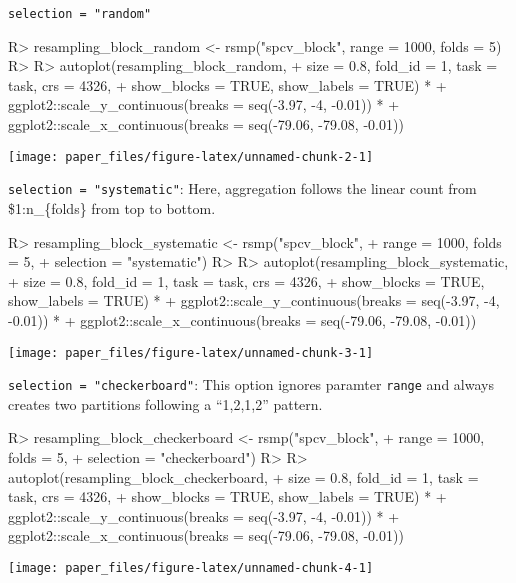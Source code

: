 \documentclass[
]{jss}
\begin{document}
\texttt{selection\ =\ "random"}

\begin{CodeChunk}
\begin{CodeInput}
R> resampling_block_random <- rsmp("spcv_block", range = 1000, folds = 5)
R> 
R> autoplot(resampling_block_random,
+   size = 0.8, fold_id = 1, task = task, crs = 4326,
+   show_blocks = TRUE, show_labels = TRUE) *
+   ggplot2::scale_y_continuous(breaks = seq(-3.97, -4, -0.01)) *
+   ggplot2::scale_x_continuous(breaks = seq(-79.06, -79.08, -0.01))
\end{CodeInput}


\begin{center}\texttt{[image: paper\_files/figure-latex/unnamed-chunk-2-1]} \end{center}

\end{CodeChunk}

\texttt{selection\ =\ "systematic"}: Here, aggregation follows the
linear count from \$1:n\_\{folds\} from top to bottom.

\begin{CodeChunk}
\begin{CodeInput}
R> resampling_block_systematic <- rsmp("spcv_block",
+   range = 1000, folds = 5,
+   selection = "systematic")
R> 
R> autoplot(resampling_block_systematic,
+   size = 0.8, fold_id = 1, task = task, crs = 4326,
+   show_blocks = TRUE, show_labels = TRUE) *
+   ggplot2::scale_y_continuous(breaks = seq(-3.97, -4, -0.01)) *
+   ggplot2::scale_x_continuous(breaks = seq(-79.06, -79.08, -0.01))
\end{CodeInput}


\begin{center}\texttt{[image: paper\_files/figure-latex/unnamed-chunk-3-1]} \end{center}

\end{CodeChunk}

\texttt{selection\ =\ "checkerboard"}: This option ignores paramter
\texttt{range} and always creates two partitions following a ``1,2,1,2''
pattern.

\begin{CodeChunk}
\begin{CodeInput}
R> resampling_block_checkerboard <- rsmp("spcv_block",
+   range = 1000, folds = 5,
+   selection = "checkerboard")
R> 
R> autoplot(resampling_block_checkerboard,
+   size = 0.8, fold_id = 1, task = task, crs = 4326,
+   show_blocks = TRUE, show_labels = TRUE) *
+   ggplot2::scale_y_continuous(breaks = seq(-3.97, -4, -0.01)) *
+   ggplot2::scale_x_continuous(breaks = seq(-79.06, -79.08, -0.01))
\end{CodeInput}


\begin{center}\texttt{[image: paper\_files/figure-latex/unnamed-chunk-4-1]} \end{center}

\end{CodeChunk}
\end{document}
